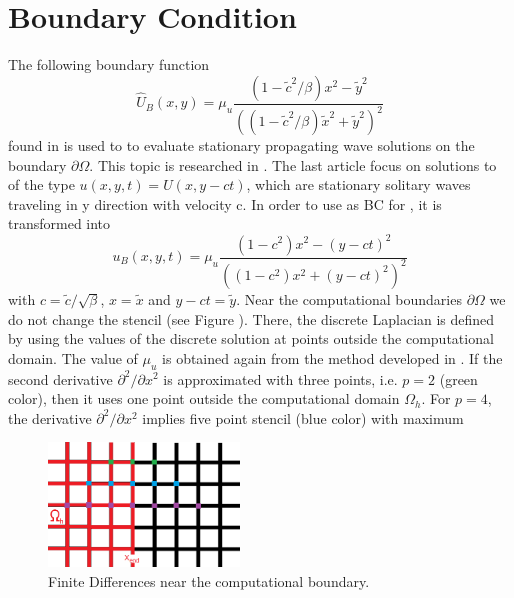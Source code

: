 \documentclass[11pt,a4paper,twoside]{article}
\begin{document}
\section{Boundary Condition}\label{BndS}
The following boundary function
\begin{equation}\label{eqBCV}
\widehat U_B(x , y) = \mu_u \frac{ (1 - \tilde c^2/\beta) x^2 - \tilde y^2}{( (1 - \tilde c^2/\beta) \tilde x^2 + \tilde y^2)^2}
\end{equation}
found in \cite{BoundaryProblem} is used to to evaluate stationary propagating wave solutions on the boundary $\partial \Omega$. This topic is researched in \cite{EllipticProblem}. The last article focus on solutions to  of the type $u(x, y, t) = U(x, y - ct)$, which are stationary solitary waves traveling in y direction
with velocity c. In order to use  as BC for , it is transformed into
\begin{equation}\label{eqBCH}
u_B(x, y, t) = \mu_u \frac{ (1 - c^2) x^2 - (y-ct)^2}{( (1 - c^2) x^2 + (y-ct)^2)^2}
\end{equation}
with $c = \tilde c / \sqrt{\beta}$, $x = \tilde x$ and $y - ct = \tilde y$. 
Near the computational boundaries $\partial \Omega$ we do not change the stencil  (see Figure ). There, the discrete Laplacian
is defined by using the values of the discrete solution  at points outside the computational domain. The value of $\mu_u$ is obtained again from the method developed in \cite{BoundaryProblem}. If the second derivative $\partial^2 / \partial x^2$ is approximated with three points, i.e. $p=2$ (green color), then it uses one point outside the computational domain $\Omega_h$. For $p=4$, the derivative $\partial^2 / \partial x^2$ implies five point stencil (blue color) with maximum
\begin{figure}[ht]%
\begin{center}
\includegraphics[width=2in]{Pictures/BoundaryPicture.png}
	\caption{Finite Differences near the computational boundary.}
	\label{fig:BoundaryFD}
  \end{center}
\end{figure}
\end{document}
